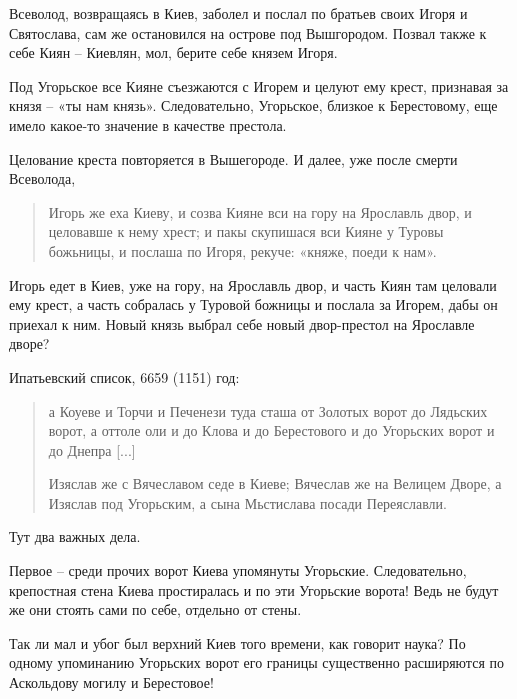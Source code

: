 Всеволод, возвращаясь в Киев, заболел и послал по братьев своих Игоря и Святослава, сам же остановился на острове под Вышгородом. Позвал также к себе Киян – Киевлян, мол, берите себе князем Игоря.

Под Угорьское все Кияне съезжаются с Игорем и целуют ему крест, признавая за князя – «ты нам князь». Следовательно, Угорьское, близкое к Берестовому, еще имело какое-то значение в качестве престола.

Целование креста повторяется в Вышегороде. И далее, уже после смерти Всеволода, 

\begin{quotation}
Игорь же еха Киеву, и созва Кияне вси на гору на Ярославль двор, и целовавше к нему хрест; и пакы скупишася вси Кияне у Туровы божьницы, и послаша по Игоря, рекуче: «княже, поеди к нам».
\end{quotation}

Игорь едет в Киев, уже на гору, на Ярославль двор, и часть Киян там целовали ему крест, а часть собралась у Туровой божницы и послала за Игорем, дабы он приехал к ним. Новый князь выбрал себе новый двор-престол на Ярославле дворе? 




Ипатьевский список, 6659 (1151) год:

\begin{quotation}
а Коуеве и Торчи и Печенези туда сташа от Золотых ворот до Лядьских ворот, а оттоле оли и до Клова и до Берестового и до Угорьских ворот и до Днепра [...]

Изяслав же с Вячеславом седе в Киеве; Вячеслав же на Велицем Дворе, а Изяслав под Угорьским, а сына Мьстислава посади Переяславли.
\end{quotation}

Тут два важных дела. 

Первое – среди прочих ворот Киева упомянуты Угорьские. Следовательно, крепостная стена Киева простиралась и по эти Угорьские ворота! Ведь не будут же они стоять сами по себе, отдельно от стены.

Так ли мал и убог был верхний Киев того времени, как говорит наука? По одному упоминанию Угорьских ворот его границы существенно расширяются по Аскольдову могилу и Берестовое!

